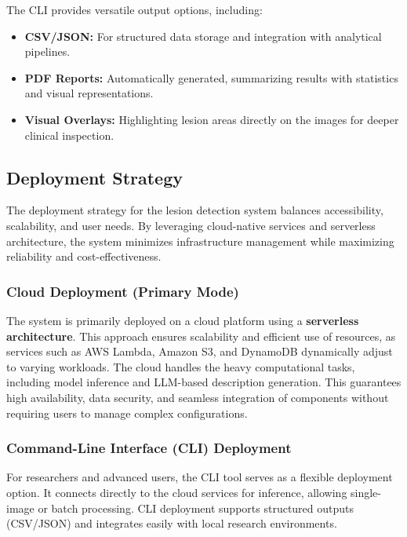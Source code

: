 \documentclass[
  12pt,
  oneside]{article}
\providecommand{\tightlist}{%
  \setlength{\itemsep}{0pt}\setlength{\parskip}{0pt}}
\begin{document}
The CLI provides versatile output options, including:

\begin{itemize}
\tightlist
\item
  \textbf{CSV/JSON:} For structured data storage and integration with
  analytical pipelines.\\
\item
  \textbf{PDF Reports:} Automatically generated, summarizing results
  with statistics and visual representations.\\
\item
  \textbf{Visual Overlays:} Highlighting lesion areas directly on the
  images for deeper clinical inspection.
\end{itemize}

\subsection{Deployment Strategy}\label{deployment-strategy}

The deployment strategy for the lesion detection system balances
accessibility, scalability, and user needs. By leveraging cloud-native
services and serverless architecture, the system minimizes
infrastructure management while maximizing reliability and
cost-effectiveness.

\subsubsection{Cloud Deployment (Primary
Mode)}\label{cloud-deployment-primary-mode}

The system is primarily deployed on a cloud platform using a
\textbf{serverless architecture}. This approach ensures scalability and
efficient use of resources, as services such as AWS Lambda, Amazon S3,
and DynamoDB dynamically adjust to varying workloads. The cloud handles
the heavy computational tasks, including model inference and LLM-based
description generation. This guarantees high availability, data
security, and seamless integration of components without requiring users
to manage complex configurations.

\subsubsection{Command-Line Interface (CLI)
Deployment}\label{command-line-interface-cli-deployment}

For researchers and advanced users, the CLI tool serves as a flexible
deployment option. It connects directly to the cloud services for
inference, allowing single-image or batch processing. CLI deployment
supports structured outputs (CSV/JSON) and integrates easily with local
research environments.
\end{document}
